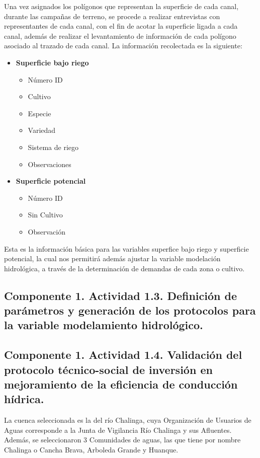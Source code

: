 \documentclass[]{article}
\begin{document}
Una vez asignados los polígonos que representan la superficie de cada canal, durante las campañas de terreno, se procede a realizar entrevistas con representantes de cada canal, con el fin de acotar la superficie ligada a cada canal, además de realizar el levantamiento de información de cada polígono asociado al trazado de cada canal. La información recolectada es la siguiente:

\begin{itemize}
	\item \textbf{Superficie bajo riego}
	\begin{itemize}	
		\item Número ID
		\item Cultivo
		\item Especie
		\item Variedad
		\item Sistema de riego
		\item Observaciones
	\end{itemize}
	\item \textbf{Superficie potencial}
	\begin{itemize}	
		\item Número ID
		\item Sin Cultivo
		\item Observación
	\end{itemize}
\end{itemize}

Esta es la información básica para las variables superfice bajo riego y superficie potencial, la cual nos permitirá además ajustar la variable modelación hidrológica, a través de la determinación de demandas de cada zona o cultivo.

\subsection{Componente 1. Actividad 1.3. Definición de parámetros y generación de los protocolos para la variable modelamiento hidrológico.}


\subsection{Componente 1. Actividad 1.4. Validación del protocolo técnico-social de inversión en mejoramiento de la eficiencia de conducción hídrica.}

La cuenca seleccionada es la del río Chalinga, cuya Organización de Usuarios de Aguas corresponde a la Junta de Vigilancia Río Chalinga y sus Afluentes. Además, se seleccionaron 3 Comunidades de aguas, las que tiene por nombre Chalinga o Cancha Brava, Arboleda Grande y Huanque. 
\end{document}
